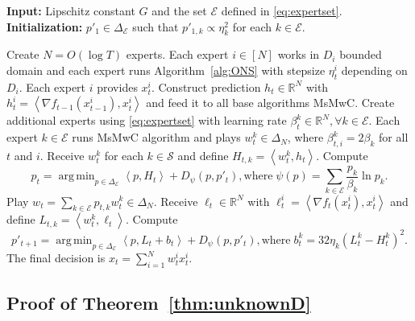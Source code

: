 \documentclass{article}
\theoremstyle{plain}
\theoremstyle{definition}
\theoremstyle{remark}
\DeclareMathOperator*{\argmin}{arg\,min}
\newcommand{\cE}{\mathcal{E}}
\newcommand{\cS}{\mathcal{S}}
\newcommand{\real}{\mathbb{R}}
\newcommand{\inner}[2]{\left\langle #1, #2 \right\rangle}
\begin{document}
\begin{algorithm}[!htb]
\caption{Multi-Scale experts--ONS for Unknown $D$ with known $G$}
\label{alg:unknownD}
\textbf{Input:}  Lipschitz constant $G$ and the set $\cE$ defined in \eqref{eq:expertset}.\\
\textbf{Initialization:} $p'_1\in\Delta_{\cE}$ such that $p'_{1,k}\propto \eta_k^2$ for each $k\in\cE$.
\begin{algorithmic}[1]
    \State Create $N=O(\log T)$ experts. Each expert $i\in[N]$ works in $D_i$ bounded domain and each expert runs Algorithm~\ref{alg:ONS} with stepsize $\eta_t^i$ depending on $D_i$.
    \State Each expert $i$ provides $x_t^i$.
    \State Construct prediction $h_t\in\real^N$ with $h_t^i=\inner{\nabla f_{t-1}(x_{t-1}^i)}{x_t^i}$ and feed it to all base algorithms MsMwC. 
    \State Create additional experts using \eqref{eq:expertset} with learning rate $\beta_t^k\in\real^N, \forall k\in\cE$.
    \State Each  expert $k\in\cE$ runs MsMwC algorithm and plays $w_t^k\in\Delta_N$, where $\beta_{t,i}^k=2\beta_k$ for all $t$ and $i$.
    \State Receive $w_t^k$ for each $k\in\cS$ and define $H_{t,k}=\inner{w_t^k}{h_t}$.
    \State Compute
    \begin{equation}
    p_t=\argmin_{p\in\Delta_{\cE}}\inner{p}{H_t}+D_{\psi}(p,p'_t), \text{where}\; \psi(p)=\sum_{k\in\cE}\frac{p_k}{\beta_k}\ln p_k.
    \end{equation}
    \State Play $w_t=\sum_{k\in\cE}p_{t,k}w_t^k\in\Delta_N$.
    \State Receive $\ell_t\in\real^N$ with $\ell_t^i=\inner{\nabla f_{t}(x_{t}^i)}{x_t^i}$ and define $L_{t,k}=\inner{w_t^k}{\ell_t}$. Compute 
    \begin{equation}
    p'_{t+1}=\argmin_{p\in\Delta_{\cE}}\inner{p}{L_t+b_t}+D_{\psi}(p,p'_t), \text{where}\; b_t^k=32\eta_k(L_t^k-H_t^k)^2.
    \end{equation}
    \State The final decision is $x_t=\sum_{i=1}^N w_{t}^i x_t^i$.
    \EndFor
    
   
\end{algorithmic}
\end{algorithm}
\fi


\subsection{Proof of Theorem~\ref{thm:unknownD}}
\end{document}
